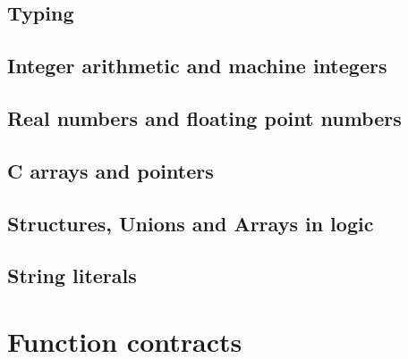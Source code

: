 \subsection{Typing}
\nodiff


\subsection{Integer arithmetic and machine integers}
\nodiff


\subsection{Real numbers and floating point numbers}
\nodiff


\subsection{C arrays and pointers}
\nodiff


\subsection{Structures, Unions and Arrays in logic}
\nodiff


\subsection{String literals}
\nodiff


\section{Function contracts}
\label{sec:fn-behavior}


